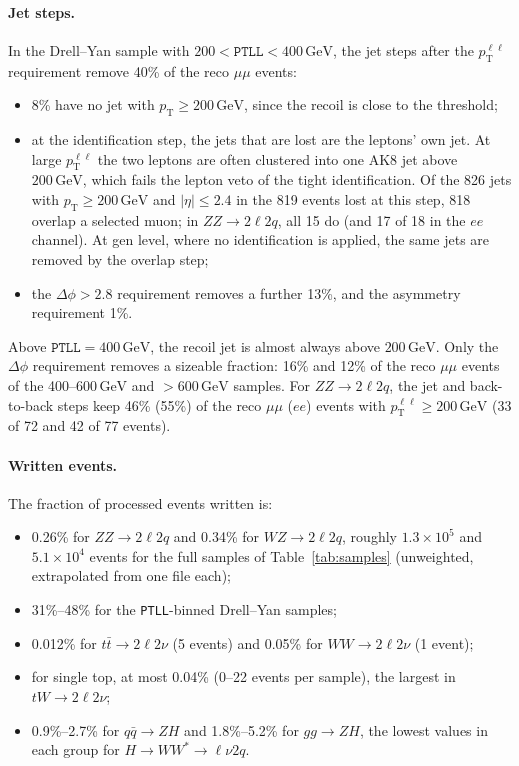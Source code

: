 \documentclass[11pt]{article}
\newcommand{\pt}{p_{\mathrm{T}}}
\newcommand{\GeV}{\ensuremath{\,\mathrm{GeV}}}
\newcommand{\ptll}{\pt^{\ell\ell}}
\newcommand{\code}[1]{\texttt{#1}}
\begin{document}
\paragraph{Jet steps.} In the Drell--Yan sample with $200 < \code{PTLL} < 400\GeV$, the jet steps after the $\ptll$
requirement remove 40\% of the reco $\mu\mu$ events:
\begin{itemize}
\item 8\% have no jet with $\pt \geq 200\GeV$, since the recoil is close to the threshold;
\item at the identification step, the jets that are lost are the leptons' own jet. At large $\ptll$ the two leptons
  are often clustered into one AK8 jet above $200\GeV$, which fails the lepton veto of the tight identification. Of the
  826 jets with $\pt \geq 200\GeV$ and $|\eta| \leq 2.4$ in the 819 events lost at this step, 818 overlap a selected
  muon; in $ZZ\to2\ell2q$, all 15 do (and 17 of 18 in the $ee$ channel). At gen level, where no identification is
  applied, the same jets are removed by the overlap step;
\item the $\Delta\phi > 2.8$ requirement removes a further 13\%, and the asymmetry requirement 1\%.
\end{itemize}
Above $\code{PTLL} = 400\GeV$, the recoil jet is almost always above $200\GeV$. Only the $\Delta\phi$ requirement
removes a sizeable fraction: 16\% and 12\% of the reco $\mu\mu$ events of the 400--600\GeV{} and $> 600\GeV$ samples.
For $ZZ\to2\ell2q$, the jet and back-to-back steps keep 46\% (55\%) of the reco $\mu\mu$ ($ee$) events with
$\ptll \geq 200\GeV$ (33 of 72 and 42 of 77 events).

\paragraph{Written events.} The fraction of processed events written is:
\begin{itemize}
\item 0.26\% for $ZZ\to2\ell2q$ and 0.34\% for $WZ\to2\ell2q$, roughly $1.3\times10^{5}$ and $5.1\times10^{4}$ events
  for the full samples of Table~\ref{tab:samples} (unweighted, extrapolated from one file each);
\item 31\%--48\% for the \code{PTLL}-binned Drell--Yan samples;
\item 0.012\% for $t\bar t\to2\ell2\nu$ (5 events) and 0.05\% for $WW\to2\ell2\nu$ (1 event);
\item for single top, at most 0.04\% (0--22 events per sample), the largest in $tW\to2\ell2\nu$;
\item 0.9\%--2.7\% for $q\bar q\to ZH$ and 1.8\%--5.2\% for $gg\to ZH$, the lowest values in each group for
  $H\to WW^*\to\ell\nu2q$.
\end{itemize}
\end{document}

